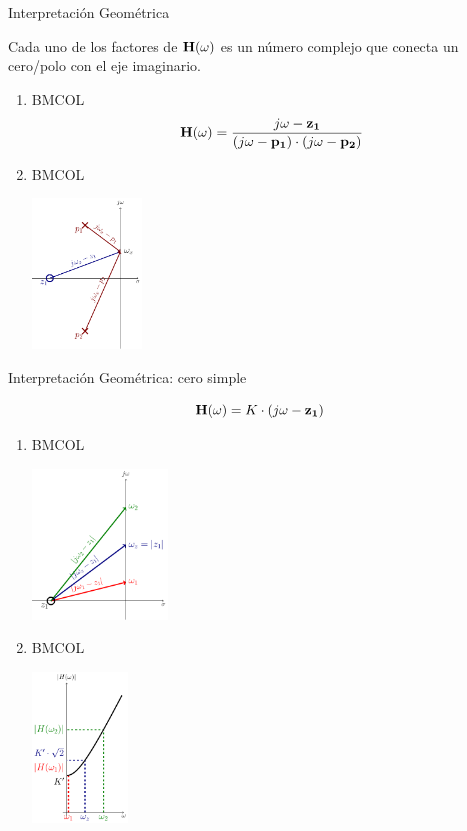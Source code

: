{Interpretación Geométrica}
\label{sec:org5b132e1}

Cada uno de los factores de \(\mathbf{H}(\omega)\) es un número complejo que conecta un cero/polo con el eje imaginario.
\begin{enumerate}
\item \hfill{}\textsc{BMCOL}
\label{sec:org34bdb21}
\[
\mathbf{H}(\omega) = \frac{j\omega - \mathbf{z_1}}{(j\omega - \mathbf{p_1}) \cdot (j\omega - \mathbf{p_2})}
\]
\item \hfill{}\textsc{BMCOL}
\label{sec:orga6ed099}
\begin{center}
\includegraphics[height=4cm]{../figs/InterpretacionGeometrica.pdf}
\end{center}
\end{enumerate}

{Interpretación Geométrica: cero simple}
\label{sec:org4228a1a}

\[
  \mathbf{H}(\omega) = K \cdot (j\omega - \mathbf{z_1})
\]

\begin{enumerate}
\item \hfill{}\textsc{BMCOL}
\label{sec:orgec55405}
\begin{center}
\includegraphics[height=4cm]{../figs/CeroGeometrica.pdf}
\end{center}

\item \hfill{}\textsc{BMCOL}
\label{sec:org876b952}
\begin{center}
\includegraphics[height=4cm]{../figs/CeroGeometricaPlot.pdf}
\end{center}
\end{enumerate}

